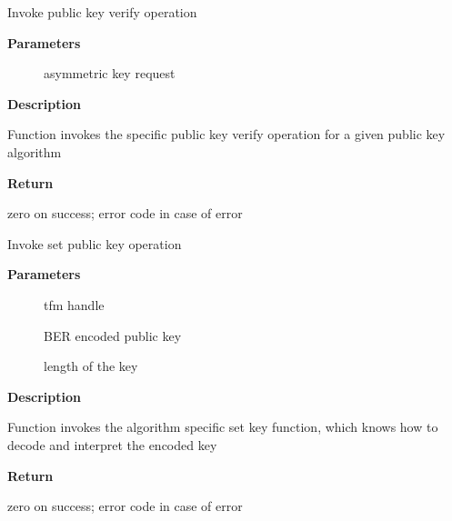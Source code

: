 \documentclass[a4paper,8pt,english]{sphinxmanual}
\begin{document}
\begin{fulllineitems}
\label{crypto/api-akcipher:c.crypto_akcipher_verify}
Invoke public key verify operation

\end{fulllineitems}


\textbf{Parameters}
\begin{description}
\item[{}] \leavevmode
asymmetric key request

\end{description}

\textbf{Description}

Function invokes the specific public key verify operation for a given
public key algorithm

\textbf{Return}

zero on success; error code in case of error

\begin{fulllineitems}
\label{crypto/api-akcipher:c.crypto_akcipher_set_pub_key}
Invoke set public key operation

\end{fulllineitems}


\textbf{Parameters}
\begin{description}
\item[{}] \leavevmode
tfm handle

\item[{}] \leavevmode
BER encoded public key

\item[{}] \leavevmode
length of the key

\end{description}

\textbf{Description}

Function invokes the algorithm specific set key function, which knows
how to decode and interpret the encoded key

\textbf{Return}

zero on success; error code in case of error
\end{document}

